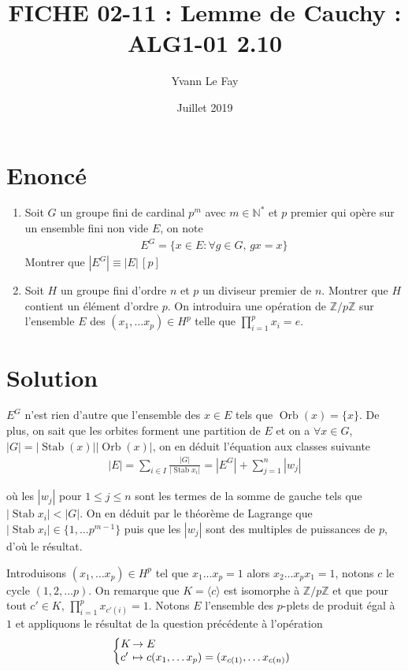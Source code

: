 \documentclass{article}
\DeclareMathOperator{\stab}{Stab}
\DeclareMathOperator{\orb}{Orb}
\begin{document}
\title{FICHE 02-11 : Lemme de Cauchy : ALG1-01 2.10}
\author{Yvann Le Fay}
\date{Juillet 2019}
\maketitle
\section*{Enoncé}
\begin{enumerate}
	\item Soit $G$ un groupe fini de cardinal $p^m$ avec $m\in\mathbb{N}^*$ et $p$ premier qui opère sur un ensemble fini non vide $E$, on note 
		\begin{align*}
			E^G = \{x\in E : \forall g \in G,\, gx = x\}
		\end{align*}
		Montrer que $|E^G| \equiv |E|\, [p]$
	\item Soit $H$ un groupe fini d'ordre $n$ et $p$ un diviseur premier de $n$. Montrer que $H$ contient un élément d'ordre $p$. On introduira une opération de $\mathbb{Z}/p\mathbb{Z}$ sur l'ensemble $E$ des $(x_1,\ldots x_p)\in H^p$ telle que $\prod_{i=1}^p x_i = e$.

\end{enumerate}
\section*{Solution}
$E^G$ n'est rien d'autre que l'ensemble des $x\in E$ tels que $\orb(x) = \{x\}$. De plus, on sait que les orbites forment une partition de $E$ et on a $\forall x \in G$, $|G|=|\stab(x)||\orb(x)|$, on en déduit l'équation aux classes suivante
\begin{align*}
	|E|=\sum_{i\in I} \frac{|G|}{|\stab{x_i}|} = |E^G|+\sum_{j=1}^n |w_j|
\end{align*}

où les $|w_j|$ pour $1\leq j \leq n$ sont les termes de la somme de gauche tels que $|\stab{x_i}|<|G|$. On en déduit par le théorème de Lagrange que $|\stab{x_i}| \in \{1,\ldots p^{m-1}\}$ puis que les $|w_j|$ sont des multiples de puissances de $p$, d'où le résultat.

Introduisons $(x_1,\ldots x_p)\in H^p$ tel que $x_1\ldots x_p = 1$ alors $x_2\ldots x_p x_1 = 1$, notons $c$ le cycle $(1, 2,\ldots p)$. On remarque que $K = \langle c\rangle$ est isomorphe à $\mathbb{Z}/p\mathbb{Z}$ et que pour tout $c'\in K$, $\prod_{i=1}^p x_{c'(i)} = 1$. Notons $E$ l'ensemble des $p$-plets de produit égal à $1$ et appliquons le résultat de la question précédente à l'opération 
\begin{align*}
 \left\{
     \begin{array}{@{}l@{\thinspace}l}
     K &\to E\\
     c'&\mapsto c(x_1,\ldots x_p) = (x_{c(1)},\ldots x_{c(n)})
     \end{array}
   \right.   
\end{align*}
\end{document}
